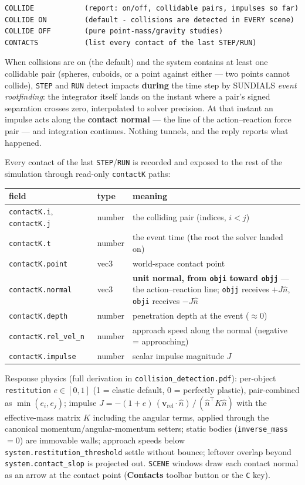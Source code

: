 \documentclass[11pt]{article}
\newcommand{\kw}[1]{\texttt{\uppercase{#1}}}
\newcommand{\code}[1]{\texttt{#1}}
\begin{document}
\begin{lstlisting}
COLLIDE            (report: on/off, collidable pairs, impulses so far)
COLLIDE ON         (default - collisions are detected in EVERY scene)
COLLIDE OFF        (pure point-mass/gravity studies)
CONTACTS           (list every contact of the last STEP/RUN)
\end{lstlisting}

When collisions are on (the default) and the system contains at least
one collidable pair (spheres, cuboids, or a point against either ---
two points cannot collide), \kw{step} and \kw{run} detect impacts
\textbf{during} the time step by SUNDIALS \emph{event rootfinding}: the
integrator itself lands on the instant where a pair's signed separation
crosses zero, interpolated to solver precision. At that instant an
impulse acts along the \textbf{contact normal} --- the line of the
action--reaction force pair --- and integration continues. Nothing
tunnels, and the reply reports what happened.

Every contact of the last \kw{step}/\kw{run} is recorded and exposed to
the rest of the simulation through read-only \code{contactK} paths:

\begin{center}\small
\begin{tabular}{llp{8.0cm}}
\textbf{field} & \textbf{type} & \textbf{meaning}\\\hline
\code{contactK.i}, \code{contactK.j} & number & the colliding pair (indices, $i < j$)\\
\code{contactK.t} & number & the event time (the root the solver landed on)\\
\code{contactK.point} & vec3 & world-space contact point\\
\code{contactK.normal} & vec3 & \textbf{unit normal, from \code{obji} toward \code{objj}} --- the action--reaction line; \code{objj} receives $+J\hat n$, \code{obji} receives $-J\hat n$\\
\code{contactK.depth} & number & penetration depth at the event ($\approx 0$)\\
\code{contactK.rel\_vel\_n} & number & approach speed along the normal (negative = approaching)\\
\code{contactK.impulse} & number & scalar impulse magnitude $J$\\
\end{tabular}
\end{center}

Response physics (full derivation in \code{collision\_detection.pdf}):
per-object \code{restitution} $e \in [0,1]$ (1 = elastic default, 0 =
perfectly plastic), pair-combined as $\min(e_i, e_j)$; impulse
$J = -(1+e)\,(\mathbf v_{\mathrm{rel}}\cdot\hat n)\,/\,(\hat n^{\!\top}
K \hat n)$ with the effective-mass matrix $K$ including the angular
terms, applied through the canonical momentum/angular-momentum setters;
static bodies (\code{inverse\_mass} $= 0$) are immovable walls;
approach speeds below \code{system.restitution\_threshold} settle
without bounce; leftover overlap beyond \code{system.contact\_slop} is
projected out. \kw{scene} windows draw each contact normal as an arrow
at the contact point (\textbf{Contacts} toolbar button or the \code{C}
key).
\end{document}

